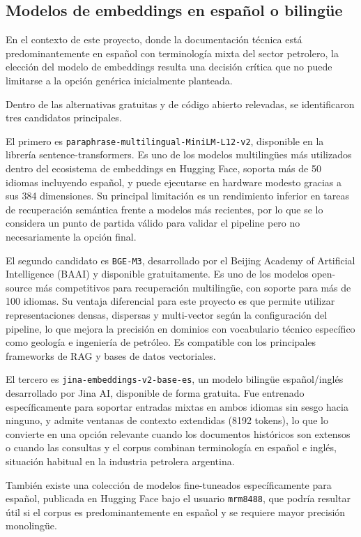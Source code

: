 \documentclass[12pt, a4paper]{report}
\begin{document}
\subsection*{Modelos de embeddings en español o bilingüe}

En el contexto de este proyecto, donde la documentación técnica está predominantemente en español con terminología mixta del sector petrolero, la elección del modelo de embeddings resulta una decisión crítica que no puede limitarse a la opción genérica inicialmente planteada.

Dentro de las alternativas gratuitas y de código abierto relevadas, se identificaron tres candidatos principales.

El primero es \texttt{paraphrase-multilingual-MiniLM-L12-v2}, disponible en la librería sentence-transformers. Es uno de los modelos multilingües más utilizados dentro del ecosistema de embeddings en Hugging Face, soporta más de 50 idiomas incluyendo español, y puede ejecutarse en hardware modesto gracias a sus 384 dimensiones. Su principal limitación es un rendimiento inferior en tareas de recuperación semántica frente a modelos más recientes, por lo que se lo considera un punto de partida válido para validar el pipeline pero no necesariamente la opción final.

El segundo candidato es \texttt{BGE-M3}, desarrollado por el Beijing Academy of Artificial Intelligence (BAAI) y disponible gratuitamente. Es uno de los modelos open-source más competitivos para recuperación multilingüe, con soporte para más de 100 idiomas. Su ventaja diferencial para este proyecto es que permite utilizar representaciones densas, dispersas y multi-vector según la configuración del pipeline, lo que mejora la precisión en dominios con vocabulario técnico específico como geología e ingeniería de petróleo. Es compatible con los principales frameworks de RAG y bases de datos vectoriales.

El tercero es \texttt{jina-embeddings-v2-base-es}, un modelo bilingüe español/inglés desarrollado por Jina AI, disponible de forma gratuita. Fue entrenado específicamente para soportar entradas mixtas en ambos idiomas sin sesgo hacia ninguno, y admite ventanas de contexto extendidas (8192 tokens), lo que lo convierte en una opción relevante cuando los documentos históricos son extensos o cuando las consultas y el corpus combinan terminología en español e inglés, situación habitual en la industria petrolera argentina.

También existe una colección de modelos fine-tuneados específicamente para español, publicada en Hugging Face bajo el usuario \texttt{mrm8488}, que podría resultar útil si el corpus es predominantemente en español y se requiere mayor precisión monolingüe.
\end{document}

